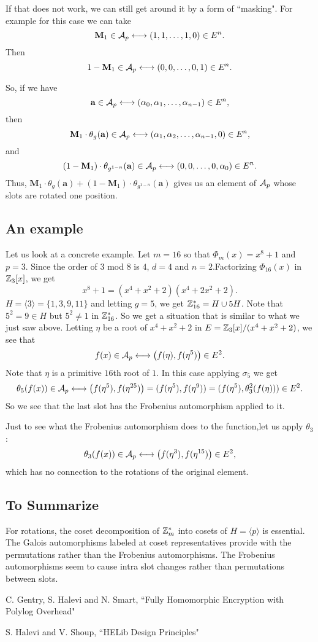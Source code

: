 \documentclass[12pt]{article}
\theoremstyle{plain}
\theoremstyle{definition}
\theoremstyle{remark}
\begin{document}
If that does not work, we can still get around it by a form of ``masking". For example for this case we can take 
$$\mathbf{M}_1 \in \mathcal{A}_p \longleftrightarrow (1,1,\dots, 1,0) \in E^n.$$
Then $$1-\mathbf{M}_1 \in \mathcal{A}_p \longleftrightarrow (0,0,\dots, 0,1) \in E^n.$$

So, if we have 
$$\mathbf{a}\in \mathcal{A}_p \longleftrightarrow (\alpha_0,\alpha_1,\dots, \alpha_{n-1}) \in E^n,$$
then 
$$\mathbf{M}_1\cdot \theta_g(\mathbf{a}) \in \mathcal{A}_p \longleftrightarrow (\alpha_1,\alpha_2,\dots, \alpha_{n-1},0) \in E^n,$$
and 
$$(1-\mathbf{M}_1)\cdot \theta_{g^{1-n}}(\mathbf{a}) \in \mathcal{A}_p \longleftrightarrow (0,0,\dots, 0,\alpha_0) \in E^n.$$
Thus,  $\mathbf{M}_1\cdot \theta_g(\mathbf{a})+(1-\mathbf{M}_1)\cdot \theta_{g^{1-n}}(\mathbf{a})$ gives us an element of $\mathcal{A}_p$ whose slots are rotated one position. 

\subsection{An example} Let us look at a concrete example.
Let $m=16$ so that $\Phi_m(x)=x^8+1$ and $p=3$. Since the order of $3$ mod 8 is $4$, $d=4$ and $n=2$.Factorizing $\Phi_{16}(x)$ in $\mathbb{Z}_3[x]$, we get 
$$x^8+1 = (x^4+x^2+2)(x^4+2x^2+2).$$
$H=\langle 3\rangle = \{1,3,9,11\}$ and letting $g=5$, we get 
$\mathbb{Z}_{16}^* = H\cup 5H$. Note that $5^2=9 \in H$ but $5^2 \neq 1$ in $\mathbb{Z}_{16}^*$.
So we get a situation that is similar to what we just saw above. 
Letting $\eta$ be a root of $x^4+x^2+2$ in $E = \mathbb{Z}_3[x]/(x^4+x^2+2)$, we see that 
$$f(x) \in \mathcal{A}_p \longleftrightarrow \left (f(\eta),f(\eta^5)\right ) \in E^2.$$ Note that $\eta$ is a primitive $16$th root of $1$. 
In this case applying $\sigma_5$ we get 
$$\theta_5(f(x)) \in \mathcal{A}_p \longleftrightarrow \left (f(\eta^5),f(\eta^{25})\right ) = (f(\eta^5), f(\eta^9)) =(f(\eta^5), \theta_3^2(f(\eta)))\in E^2.$$
So we see that the last slot has the Frobenius automorphism applied to it. 

Just to see what the Frobenius automorphism does to the function,let us apply $\theta_3$:
$$\theta_3(f(x)) \in \mathcal{A}_p \longleftrightarrow \left (f(\eta^3),f(\eta^{15})\right ) \in E^2,$$
which has no connection to the rotations of the original element. 

\subsection{To Summarize}
For rotations, the coset decomposition of $\mathbb{Z}_m^{*}$ into cosets of $H=\langle p\rangle$ is essential. The Galois automorphisms labeled at coset representatives provide with the permutations rather than the Frobenius automorphisms. The Frobenius automorphisms seem to cause intra slot changes rather than permutations between slots. 

\begin{thebibliography}{99}

 C. Gentry, S. Halevi and N. Smart, ``Fully Homomorphic 
Encryption with Polylog Overhead"

 S. Halevi and V. Shoup, ``HELib Design Principles"
\end{thebibliography}
\end{document}
